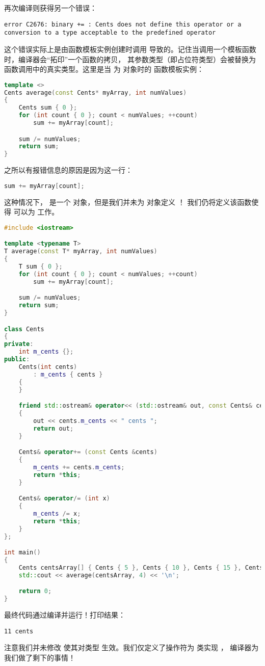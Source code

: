 \documentclass[../../LearnCpp.tex]{subfiles}
\begin{document}
再次编译则获得另一个错误：

\begin{lstlisting}
error C2676: binary += : Cents does not define this operator or a conversion to a type acceptable to the predefined operator
\end{lstlisting}

这个错误实际上是由函数模板实例创建时调用  导致的。记住当调用一个模板函数时，编译器会“拓印”一个函数的拷贝，
其参数类型（即占位符类型）会被替换为函数调用中的真实类型。这里是当  为  对象时的  函数模板实例：

\begin{lstlisting}[language=C++]
template <>
Cents average(const Cents* myArray, int numValues)
{
    Cents sum { 0 };
    for (int count { 0 }; count < numValues; ++count)
        sum += myArray[count];

    sum /= numValues;
    return sum;
}
\end{lstlisting}

之所以有报错信息的原因是因为这一行：

\begin{lstlisting}[language=C++]
sum += myArray[count];
\end{lstlisting}

这种情况下， 是一个  对象，但是我们并未为  对象定义 ！
我们仍将定义该函数使得  可以为  工作。

\begin{lstlisting}[language=C++]
#include <iostream>

template <typename T>
T average(const T* myArray, int numValues)
{
    T sum { 0 };
    for (int count { 0 }; count < numValues; ++count)
        sum += myArray[count];

    sum /= numValues;
    return sum;
}

class Cents
{
private:
    int m_cents {};
public:
    Cents(int cents)
        : m_cents { cents }
    {
    }

    friend std::ostream& operator<< (std::ostream& out, const Cents& cents)
    {
        out << cents.m_cents << " cents ";
        return out;
    }

    Cents& operator+= (const Cents &cents)
    {
        m_cents += cents.m_cents;
        return *this;
    }

    Cents& operator/= (int x)
    {
        m_cents /= x;
        return *this;
    }
};

int main()
{
    Cents centsArray[] { Cents { 5 }, Cents { 10 }, Cents { 15 }, Cents { 14 } };
    std::cout << average(centsArray, 4) << '\n';

    return 0;
}
\end{lstlisting}

最终代码通过编译并运行！打印结果：

\begin{lstlisting}
11 cents
\end{lstlisting}

注意我们并未修改  使其对类型  生效。我们仅定义了操作符为  类实现 ，
编译器为我们做了剩下的事情！
\end{document}
